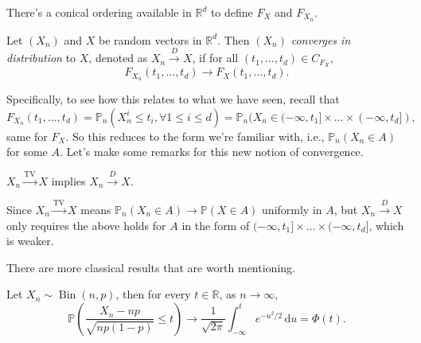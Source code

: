 \begin{intuition}
	There's a conical ordering available in \(\mathbb{R} ^d\) to define \(F_X\) and \(F_{X_n}\).
\end{intuition}

\begin{definition}\label{def:converge-in-distribution}
	Let \((X_n)\) and \(X\) be random vectors in \(\mathbb{R} ^d\). Then \((X_n)\) \emph{converges in distribution} to \(X\), denoted as \(X_n \overset{D}{\to } X\), if for all \((t_1, \dots , t_d) \in C_{F_X}\),
	\[
		F_{X_n} (t_1, \dots , t_d) \to F_X (t_1, \dots , t_d).
	\]
\end{definition}

Specifically, to see how this relates to what we have seen, recall that
\[
	F_{X_n}(t_1, \dots , t_d)
	= \mathbb{P} _{n}(X_n^i \leq t_i , \forall1 \leq i \leq d)
	= \mathbb{P} _{n}(X_n \in (-\infty , t_1] \times \dots \times (-\infty , t_d]),
\]
same for \(F_X\). So this reduces to the form we're familiar with, i.e., \(\mathbb{P} _{n}(X_n \in A)\) for some \(A\). Let's make some remarks for this new notion of convergence.

\begin{remark}
	\(X_n \overset{\operatorname{TV} }{\to } X\) implies \(X_n \overset{D}{\to } X\).
\end{remark}
\begin{explanation}
	Since \(X_n \overset{\operatorname{TV} }{\to } X \) means \(\mathbb{P} _{n}(X_n \in A) \to \mathbb{P} (X \in A)\) uniformly in \(A\), but \(X_n \overset{D}{\to } X\) only requires the above holds for \(A\) in the form of \((-\infty , t_1] \times \dots \times (-\infty , t_d]\), which is weaker.
\end{explanation}

There are more classical results that are worth mentioning.

\begin{remark}
	Let \(X_n \sim \operatorname{Bin}(n, p) \), then for every \(t \in \mathbb{R} \), as \(n \to \infty \),
	\[
		\mathbb{P} \left( \frac{X_n - np}{\sqrt{np (1 - p)} } \leq t \right)
		\to \frac{1}{\sqrt{2\pi } } \int_{-\infty}^{t} e^{- u^2 / 2} \,\mathrm{d}u
		= \Phi (t).
	\]
\end{remark}

